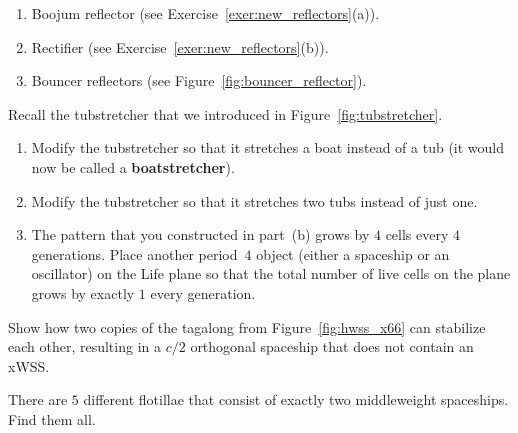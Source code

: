 \begin{multicols}{2}
\begin{problemstar}
\begin{enumerate}[label=\bf\color{ocre}(\alph*)]
			\item Boojum reflector (see Exercise~\ref{exer:new_reflectors}(a)).
			
			\item Rectifier (see Exercise~\ref{exer:new_reflectors}(b)).
			
			\item Bouncer reflectors (see Figure~\ref{fig:bouncer_reflector}).
		\end{enumerate}
	\end{problemstar}
	
	
	\mfilbreak
	
	
	\begin{problem}\label{exer:tubstretcher_modify}
		Recall the tubstretcher that we introduced in Figure~\ref{fig:tubstretcher}.\smallskip
		
		\begin{enumerate}[label=\bf\color{ocre}(\alph*)]
			\item {} Modify the tubstretcher so that it stretches a boat instead of a tub (it would now be called a \textbf{boatstretcher}).
			
			\item {} Modify the tubstretcher so that it stretches two tubs instead of just one.
			
			\item {} The pattern that you constructed in part~(b) grows by $4$ cells every $4$ generations. Place another period~$4$ object (either a spaceship or an oscillator) on the Life plane so that the total number of live cells on the plane grows by exactly $1$ every generation. %
		\end{enumerate}
	\end{problem}


	\mfilbreak
	
	
	\begin{problem}\label{exer:x66} 
		Show how two copies of the tagalong from Figure~\ref{fig:hwss_x66} can stabilize each other, resulting in a $c/2$ orthogonal spaceship that does not contain an xWSS.
	\end{problem}
	
	
	\mfilbreak
	
	
	\begin{problem}\label{exer:mwss_flotilla} 
		There are $5$ different flotillae that consist of exactly two middleweight spaceships. Find them all.
	\end{problem}
	

\end{multicols}
